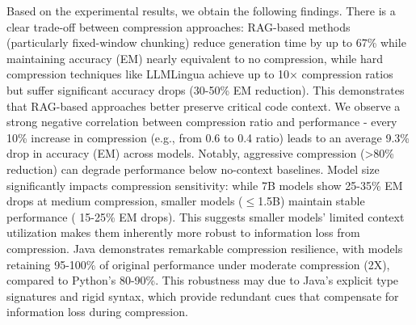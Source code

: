 Based on the experimental results, we obtain the following findings.
 There is a clear trade-off between compression approaches: RAG-based methods (particularly fixed-window chunking) reduce generation time by up to 67\% while maintaining accuracy (EM) nearly equivalent to no compression, while hard compression techniques like LLMLingua achieve up to 10× compression ratios but suffer significant accuracy drops (30-50\% EM reduction). This demonstrates that RAG-based approaches better preserve critical code context.
 We observe a strong negative correlation between compression ratio and performance - every 10\% increase in compression (e.g., from 0.6 to 0.4 ratio) leads to an average 9.3\% drop in  accuracy (EM) across models. Notably, aggressive compression (>80\% reduction) can degrade performance below no-context baselines. %
 Model size significantly impacts compression sensitivity: while 7B models show 25-35\% EM drops at medium compression, smaller models ($\leq$1.5B) maintain stable performance ( 15-25\% EM drops). This suggests smaller models' limited context utilization makes them inherently more robust to information loss from compression.
 Java demonstrates remarkable compression resilience, with models retaining 95-100\% of original performance under moderate compression (2X), compared to Python's 80-90\%. This robustness may due  to Java's explicit type signatures and rigid syntax, which provide redundant cues that compensate for information loss during compression.





